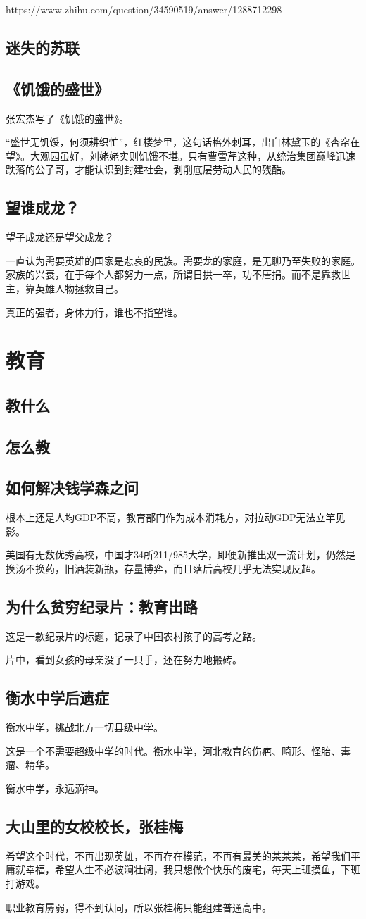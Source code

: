 \documentclass[fontset=founder]{ctexbook}
\begin{document}
https://www.zhihu.com/question/34590519/answer/1288712298

\section{迷失的苏联}

\section{《饥饿的盛世》}
张宏杰写了《饥饿的盛世》。

“盛世无饥馁，何须耕织忙”，红楼梦里，这句话格外刺耳，出自林黛玉的《杏帘在望》。大观园虽好，刘姥姥实则饥饿不堪。只有曹雪芹这种，从统治集团巅峰迅速跌落的公子哥，才能认识到封建社会，剥削底层劳动人民的残酷。


\section{望谁成龙？}
望子成龙还是望父成龙？

一直认为需要英雄的国家是悲哀的民族。需要龙的家庭，是无聊乃至失败的家庭。家族的兴衰，在于每个人都努力一点，所谓日拱一卒，功不唐捐。而不是靠救世主，靠英雄人物拯救自己。

真正的强者，身体力行，谁也不指望谁。


\chapter{教育}

\section{教什么}
\section{怎么教}
\section{如何解决钱学森之问}
根本上还是人均GDP不高，教育部门作为成本消耗方，对拉动GDP无法立竿见影。

美国有无数优秀高校，中国才34所211/985大学，即便新推出双一流计划，仍然是换汤不换药，旧酒装新瓶，存量博弈，而且落后高校几乎无法实现反超。

\section{为什么贫穷纪录片：教育出路}
这是一款纪录片的标题，记录了中国农村孩子的高考之路。

片中，看到女孩的母亲没了一只手，还在努力地搬砖。

\section{衡水中学后遗症}
衡水中学，挑战北方一切县级中学。

这是一个不需要超级中学的时代。衡水中学，河北教育的伤疤、畸形、怪胎、毒瘤、精华。

衡水中学，永远滴神。

\section{大山里的女校校长，张桂梅}
希望这个时代，不再出现英雄，不再存在模范，不再有最美的某某某，希望我们平庸就幸福，希望人生不必波澜壮阔，我只想做个快乐的废宅，每天上班摸鱼，下班打游戏。

职业教育孱弱，得不到认同，所以张桂梅只能组建普通高中。
 
\end{document}

